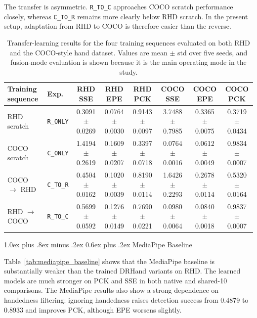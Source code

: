 \documentclass[10pt,letterpaper]{article}
\makeatletter
\renewcommand\subsection{\@startsection{subsection}{2}{\z@}%
  {1.0ex plus .8ex minus .2ex}%
  {0.6ex plus .2ex}%
  {\normalfont\itshape}}
\makeatother
\begin{document}
The transfer is asymmetric. \texttt{R\_TO\_C} approaches COCO scratch performance closely, whereas \texttt{C\_TO\_R} remains more clearly below RHD scratch. In the present setup, adaptation from RHD to COCO is therefore easier than the reverse.

\begin{table}[H]
\centering
\footnotesize
\caption{Transfer-learning results for the four training sequences evaluated on both RHD and the COCO-style hand dataset. Values are mean $\pm$ std over five seeds, and fusion-mode evaluation is shown because it is the main operating mode in the study.}
\label{tab:transfer_learning}
\begin{tabular}{llcccccc}
\toprule
Training sequence & Exp. & RHD SSE & RHD EPE & RHD PCK & COCO SSE & COCO EPE & COCO PCK \\
\midrule
RHD scratch & \texttt{R\_ONLY} & 0.3091 $\pm$ 0.0269 & 0.0764 $\pm$ 0.0030 & 0.9143 $\pm$ 0.0097 & 3.7488 $\pm$ 0.7985 & 0.3365 $\pm$ 0.0075 & 0.3719 $\pm$ 0.0434 \\
COCO scratch & \texttt{C\_ONLY} & 1.4194 $\pm$ 0.2619 & 0.1609 $\pm$ 0.0207 & 0.3397 $\pm$ 0.0718 & 0.0764 $\pm$ 0.0016 & 0.0612 $\pm$ 0.0049 & 0.9834 $\pm$ 0.0007 \\
COCO $\rightarrow$ RHD & \texttt{C\_TO\_R} & 0.4504 $\pm$ 0.0162 & 0.1020 $\pm$ 0.0039 & 0.8190 $\pm$ 0.0114 & 1.6426 $\pm$ 0.2293 & 0.2678 $\pm$ 0.0114 & 0.5320 $\pm$ 0.0164 \\
RHD $\rightarrow$ COCO & \texttt{R\_TO\_C} & 0.5699 $\pm$ 0.0592 & 0.1276 $\pm$ 0.0149 & 0.7690 $\pm$ 0.0221 & 0.0980 $\pm$ 0.0064 & 0.0840 $\pm$ 0.0018 & 0.9837 $\pm$ 0.0007 \\
\bottomrule
\end{tabular}
\end{table}

\subsection{MediaPipe Baseline}

Table~\ref{tab:mediapipe_baseline} shows that the MediaPipe baseline is substantially weaker than the trained DRHand variants on RHD. The learned models are much stronger on PCK and SSE in both native and shared-10 comparisons. The MediaPipe results also show a strong dependence on handedness filtering: ignoring handedness raises detection success from 0.4879 to 0.8933 and improves PCK, although EPE worsens slightly.
\end{document}
